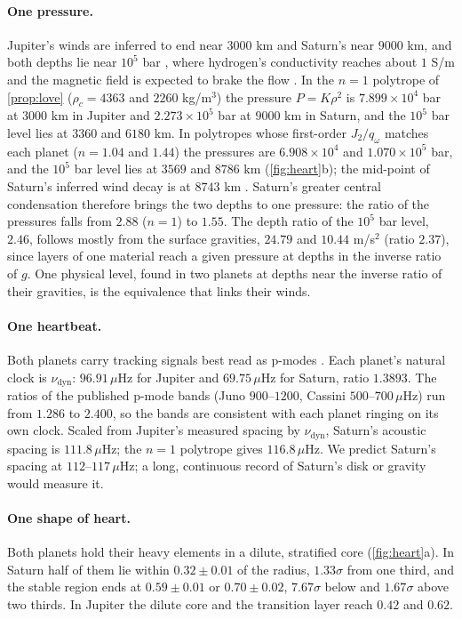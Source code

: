 \documentclass[11pt]{article}
\theoremstyle{definition}\newtheorem{definition}[theorem]{Definition}
\theoremstyle{remark}\newtheorem{remark}[theorem]{Remark}
\newcommand{\muH}{\,\mu\mathrm{Hz}}
\begin{document}
\paragraph{One pressure.} Jupiter's winds are inferred to end near $3000$ km and Saturn's near $9000$ km, and both depths lie near $10^5$ bar \cite{Kaspi2020}, where hydrogen's conductivity reaches about $1$ S/m and the magnetic field is expected to brake the flow \cite{Kaspi2020,Galanti}. In the $n=1$ polytrope of \cref{prop:love} ($\rho_c=4363$ and $2260$ kg/m$^3$) the pressure $P=K\rho^2$ is $7.899\times10^4$ bar at $3000$ km in Jupiter and $2.273\times10^5$ bar at $9000$ km in Saturn, and the $10^5$ bar level lies at $3360$ and $6180$ km. In polytropes whose first-order $J_2/q_\omega$ matches each planet ($n=1.04$ and $1.44$) the pressures are $6.908\times10^4$ and $1.070\times10^5$ bar, and the $10^5$ bar level lies at $3569$ and $8786$ km (\cref{fig:heart}b); the mid-point of Saturn's inferred wind decay is at $8743$ km \cite{Galanti}. Saturn's greater central condensation therefore brings the two depths to one pressure: the ratio of the pressures falls from $2.88$ ($n=1$) to $1.55$. The depth ratio of the $10^5$ bar level, $2.46$, follows mostly from the surface gravities, $24.79$ and $10.44$ m/s$^2$ (ratio $2.37$), since layers of one material reach a given pressure at depths in the inverse ratio of $g$. One physical level, found in two planets at depths near the inverse ratio of their gravities, is the equivalence that links their winds.

\paragraph{One heartbeat.} Both planets carry tracking signals best read as p-modes \cite{Durante2022,Markham}. Each planet's natural clock is $\nu_\mathrm{dyn}$: $96.91\muH$ for Jupiter and $69.75\muH$ for Saturn, ratio $1.3893$. The ratios of the published p-mode bands (Juno $900$--$1200$, Cassini $500$--$700\muH$) run from $1.286$ to $2.400$, so the bands are consistent with each planet ringing on its own clock. Scaled from Jupiter's measured spacing by $\nu_\mathrm{dyn}$, Saturn's acoustic spacing is $111.8\muH$; the $n=1$ polytrope gives $116.8\muH$. We predict Saturn's spacing at $112$--$117\muH$; a long, continuous record of Saturn's disk or gravity would measure it.

\paragraph{One shape of heart.} Both planets hold their heavy elements in a dilute, stratified core (\cref{fig:heart}a). In Saturn half of them lie within $0.32\pm0.01$ of the radius, $1.33\sigma$ from one third, and the stable region ends at $0.59\pm0.01$ or $0.70\pm0.02$, $7.67\sigma$ below and $1.67\sigma$ above two thirds. In Jupiter the dilute core and the transition layer reach $0.42$ and $0.62$.
\end{document}
